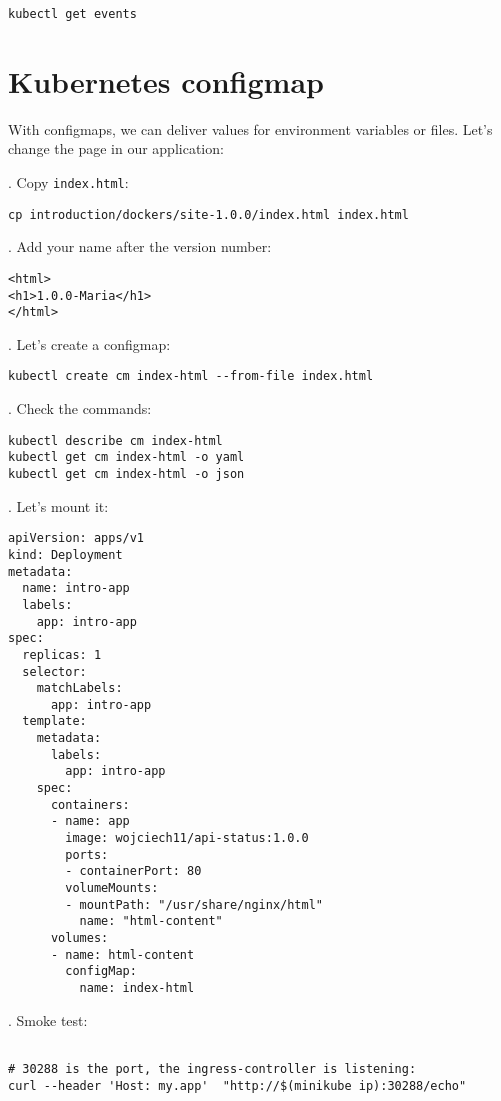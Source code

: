 \documentclass[12pt, letterpaper]{article}
\begin{document}
\begin{verbatim}
kubectl get events
\end{verbatim}

%
%
%
\section{Kubernetes configmap}

With configmaps, we can deliver values for environment variables or files. Let's change the page in our application:

. Copy \verb|index.html|:

\begin{verbatim}
cp introduction/dockers/site-1.0.0/index.html index.html
\end{verbatim}

. Add your name after the version number:

\begin{verbatim}
<html>
<h1>1.0.0-Maria</h1>
</html>
\end{verbatim}

. Let's create a configmap:

\begin{verbatim}
kubectl create cm index-html --from-file index.html
\end{verbatim}

. Check the commands:

\begin{verbatim}
kubectl describe cm index-html
kubectl get cm index-html -o yaml
kubectl get cm index-html -o json
\end{verbatim}

. Let's mount it:

\begin{verbatim}
apiVersion: apps/v1
kind: Deployment
metadata:
  name: intro-app
  labels:
    app: intro-app
spec:
  replicas: 1
  selector:
    matchLabels:
      app: intro-app
  template:
    metadata:
      labels:
        app: intro-app
    spec:
      containers:
      - name: app
        image: wojciech11/api-status:1.0.0
        ports:
        - containerPort: 80
        volumeMounts:
        - mountPath: "/usr/share/nginx/html"
          name: "html-content"
      volumes:
      - name: html-content
        configMap:
          name: index-html
\end{verbatim}

. Smoke test:

\begin{verbatim}

# 30288 is the port, the ingress-controller is listening:
curl --header 'Host: my.app'  "http://$(minikube ip):30288/echo"
\end{verbatim}
\end{document}
